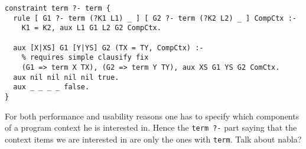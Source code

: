 \documentclass[preprint]{sigplanconf}
\begin{document}
\begin{verbatim}
constraint term ?- term {
  rule [ G1 ?- term (?K1 L1) _ ] [ G2 ?- term (?K2 L2) _ ] CompCtx :-
    K1 = K2, aux L1 G1 L2 G2 CompCtx.

  aux [X|XS] G1 [Y|YS] G2 (TX = TY, CompCtx) :-
    % requires simple clausify fix
    (G1 => term X TX), (G2 => term Y TY), aux XS G1 YS G2 ComCtx.
  aux nil nil nil nil true.
  aux _ _ _ _ false.   
}
\end{verbatim}

For both performance and usability reasons one has to specify
which components of a program context he is interested in.  Hence the
\verb+term ?-+ part saying that the context items we are interested in
are only the ones with \verb+term+.  Talk about nabla?

% 
% 
\end{document}
